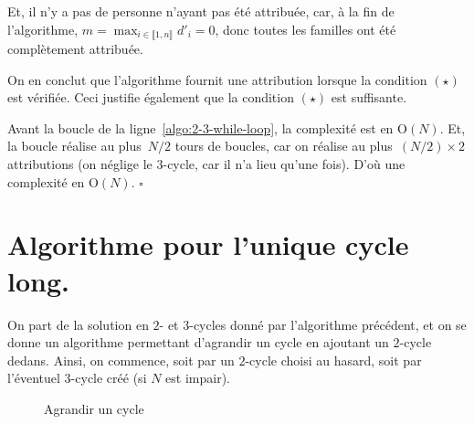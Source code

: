 \documentclass{../../notes}
\begin{document}
  Et, il n'y a pas de personne n'ayant pas été attribuée, car, à la fin de l'algorithme, $m = \max_{i \in \llbracket 1,n\rrbracket  } d'_i = 0$, donc toutes les familles ont été complètement attribuée.

  On en conclut que l'algorithme fournit une attribution lorsque la condition $(\star)$ est vérifiée.
  Ceci justifie également que la condition $(\star)$ est suffisante.

  Avant la boucle de la ligne~\ref{algo:2-3-while-loop}, la complexité est en $\mathrm{O}(N)$.
  Et, la boucle réalise au plus~$N / 2$ tours de boucles, car on réalise au plus~$(N / 2) \times 2$ attributions (on néglige le $3$-cycle, car il n'a lieu qu'une fois).
  D'où une complexité en $\mathrm{O}(N)$.
  \hfill $\square$

  \chapter{Algorithme pour l'unique cycle long.}

  On part de la solution en $2$- et $3$-cycles donné par l'algorithme précédent, et on se donne un algorithme permettant d'agrandir un cycle en ajoutant un $2$-cycle dedans.
  Ainsi, on commence, soit par un $2$-cycle choisi au hasard, soit par l'éventuel $3$-cycle créé (si $N$ est impair).

  \begin{figure}[H]
    \centering
    \caption{Agrandir un cycle}
  \end{figure}
\end{document}
